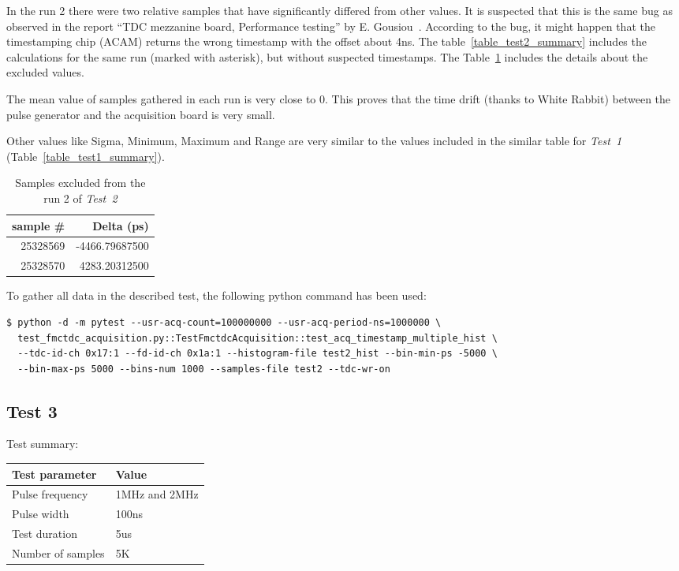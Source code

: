 \documentclass[a4paper, 12pt]{article}
\begin{document}
In the run 2 there were two relative samples that have significantly differed
from other values.
It is suspected that this is the same bug as observed in the report
``TDC mezzanine board, Performance testing''
by E. Gousiou~\cite{tdc_perf_test}.
According to the bug, it might happen that the timestamping chip (ACAM) returns
the wrong timestamp with the offset about 4ns.
The table~\ref{table_test2_summary}
includes the calculations for the same run (marked with asterisk),
but without suspected timestamps. The Table~\ref{table_test2_samples_excluded}
includes the details about the excluded values.

The mean value of samples gathered in each run is very close to 0.
This proves that the time drift (thanks to White Rabbit) between
the pulse generator and the acquisition board is very small.

Other values like Sigma, Minimum, Maximum and Range are very similar to
the values included in the similar table for \textit{Test~1}
(Table~\ref{table_test1_summary}).

\begin{table}[!htb]
  \centering
  \footnotesize
  \begin{tabular}{|r|r|}
    \hline {\bf sample \#} & {\bf Delta (ps)} \\
    \hline
    25328569 & -4466.79687500 \\
    25328570 &  4283.20312500 \\
    \hline
  \end{tabular}
  \caption{Samples excluded from the run 2 of \textit{Test~2}}
  \label{table_test2_samples_excluded}
\end{table}

\FloatBarrier

To gather all data in the described test, the following python command has been
used:
\begin{lstlisting}
$ python -d -m pytest --usr-acq-count=100000000 --usr-acq-period-ns=1000000 \
  test_fmctdc_acquisition.py::TestFmctdcAcquisition::test_acq_timestamp_multiple_hist \
  --tdc-id-ch 0x17:1 --fd-id-ch 0x1a:1 --histogram-file test2_hist --bin-min-ps -5000 \
  --bin-max-ps 5000 --bins-num 1000 --samples-file test2 --tdc-wr-on
\end{lstlisting}

\FloatBarrier

\subsection{Test 3}
\label{test3}
Test summary:
\begin{center}
  \begin{tabular}{|l|l|}
    \hline {\bf Test parameter} & {\bf Value} \\
    \hline
    Pulse frequency                      & 1MHz and 2MHz \\
    Pulse width                          & 100ns \\
    Test duration                        & 5us \\
    Number of samples                    & 5K \\
    \hline
  \end{tabular}
\end{center}
\end{document}
